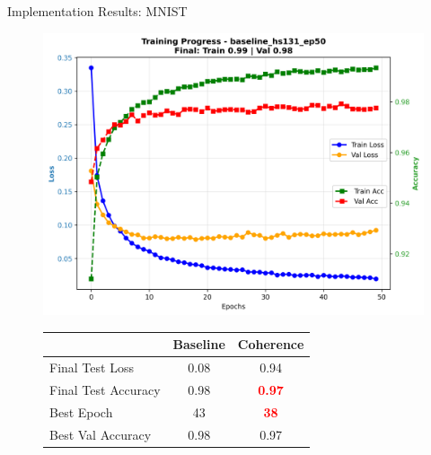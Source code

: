 \documentclass[9pt,dvipsnames]{beamer}
\begin{document}
\begin{frame}{Implementation Results: MNIST}

    
    \begin{figure}[H]
        \centering
        \begin{minipage}[b]{0.48\textwidth}
            \centering
            \includegraphics[width=\textwidth]{../plots/mlp/mnist/hs131_ep50/baseline_hs131_ep50_training_curves.png}
			\vspace{0.2\textheight}
            {\scriptsize
            \begin{tabular}{lcc}
                \toprule
                & \textbf{Baseline} & \textbf{Coherence} \\
                \midrule
                Final Test Loss & 0.08 & 0.94 \\
                Final Test Accuracy & 0.98 & \textbf{\textcolor{red}{0.97}} \\
                Best Epoch & 43 & \textbf{\textcolor{red}{38}} \\
                Best Val Accuracy & 0.98 & 0.97 \\
                \bottomrule
            \end{tabular}
            }
			\vspace{0.1\textheight}
        \end{minipage}%
        \hfill
        \begin{minipage}[b]{0.48\textwidth}
            \centering

\end{minipage}
\end{figure}
\end{frame}
\end{document}
